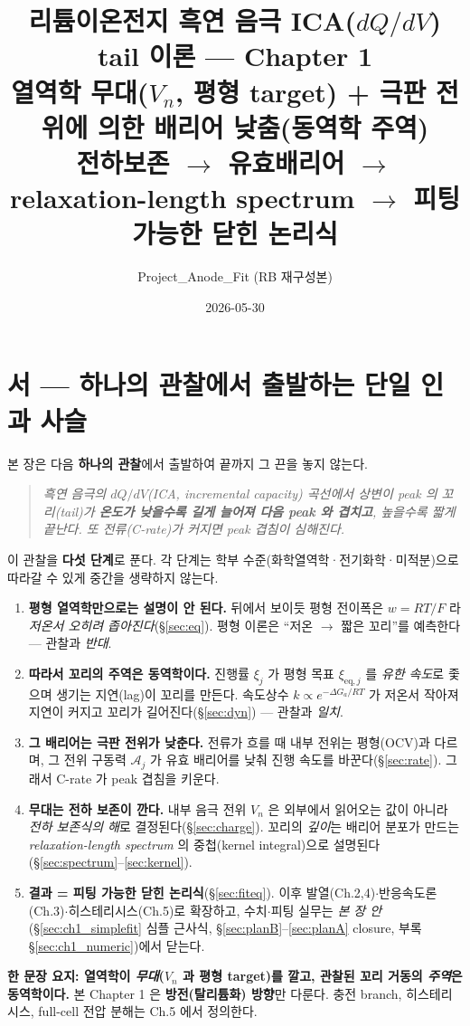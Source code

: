 \documentclass[11pt,a4paper]{article}
\title{\textbf{리튬이온전지 흑연 음극 ICA($dQ/dV$) tail 이론 — Chapter 1}\\[0.4em]
\large 열역학 무대($V_n$, 평형 target) + 극판 전위에 의한 배리어 낮춤(동역학 주역)\\[0.2em]
\normalsize 전하보존 $\to$ 유효배리어 $\to$ relaxation-length spectrum $\to$ 피팅 가능한 닫힌 논리식}
\author{Project\_Anode\_Fit (RB 재구성본)}
\date{2026-05-30}
\newcommand{\eq}{\mathrm{eq}}
\begin{document}
\maketitle

\section*{서 — 하나의 관찰에서 출발하는 단일 인과 사슬}
본 장은 다음 \textbf{하나의 관찰}에서 출발하여 끝까지 그 끈을 놓지 않는다.
\begin{quote}\itshape
흑연 음극의 $dQ/dV$(ICA, incremental capacity) 곡선에서 상변이 peak 의 꼬리(tail)가 \textbf{온도가
낮을수록 길게 늘어져 다음 peak 와 겹치고}, 높을수록 짧게 끝난다. 또 전류(C-rate)가 커지면 peak 겹침이
심해진다.
\end{quote}
이 관찰을 \textbf{다섯 단계}로 푼다. 각 단계는 학부 수준(화학열역학·전기화학·미적분)으로 따라갈 수 있게
중간을 생략하지 않는다.
\begin{enumerate}[label=\textbf{(\arabic*)},leftmargin=2.2em]
\item \textbf{평형 열역학만으로는 설명이 안 된다.} 뒤에서 보이듯 평형 전이폭은 $w=RT/F$ 라 \emph{저온서
  오히려 좁아진다}(\S\ref{sec:eq}). 평형 이론은 ``저온 $\to$ 짧은 꼬리''를 예측한다 — 관찰과 \emph{반대}.
\item \textbf{따라서 꼬리의 주역은 동역학이다.} 진행률 $\xi_j$ 가 평형 목표 $\xi_{\eq,j}$ 를 \emph{유한
  속도}로 좇으며 생기는 지연(lag)이 꼬리를 만든다. 속도상수 $k\propto e^{-\Delta G_a/RT}$ 가 저온서
  작아져 지연이 커지고 꼬리가 길어진다(\S\ref{sec:dyn}) — 관찰과 \emph{일치}.
\item \textbf{그 배리어는 극판 전위가 낮춘다.} 전류가 흐를 때 내부 전위는 평형(OCV)과 다르며, 그 전위
  구동력 $\mathcal A_j$ 가 유효 배리어를 낮춰 진행 속도를 바꾼다(\S\ref{sec:rate}). 그래서 C-rate 가
  peak 겹침을 키운다.
\item \textbf{무대는 전하 보존이 깐다.} 내부 음극 전위 $V_n$ 은 외부에서 읽어오는 값이 아니라 \emph{전하
  보존식의 해}로 결정된다(\S\ref{sec:charge}). 꼬리의 \emph{깊이}는 배리어 분포가 만드는
  \emph{relaxation-length spectrum} 의 중첩(kernel integral)으로 설명된다(\S\ref{sec:spectrum}--\ref{sec:kernel}).
\item \textbf{결과 = 피팅 가능한 닫힌 논리식}(\S\ref{sec:fiteq}). 이후 발열(Ch.2,4)$\cdot$반응속도론
  (Ch.3)$\cdot$히스테리시스(Ch.5)로 확장하고, 수치$\cdot$피팅 실무는 \emph{본 장 안}(\S\ref{sec:ch1_simplefit} 심플
근사식, \S\ref{sec:planB}--\ref{sec:planA} closure, 부록 \S\ref{sec:ch1_numeric})에서 닫는다.
\end{enumerate}
\noindent\textbf{한 문장 요지: 열역학이 \emph{무대}($V_n$ 과 평형 target)를 깔고, 관찰된 꼬리 거동의
\emph{주역}은 동역학이다.} 본 Chapter 1 은 \textbf{방전(탈리튬화) 방향}만 다룬다. 충전 branch,
히스테리시스, full-cell 전압 분해는 Ch.5 에서 정의한다.
\end{document}
